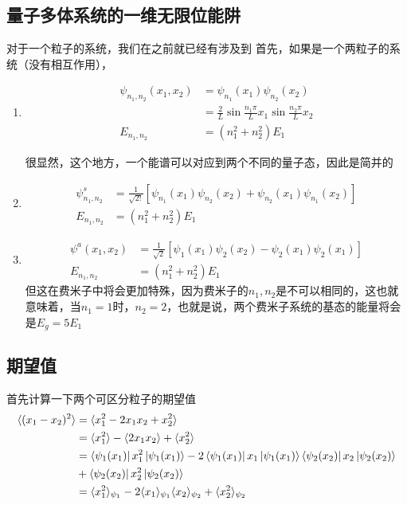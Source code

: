 \documentclass{article}
\newcommand{\expectation}[1]{\langle #1 \rangle}
\begin{document}
\subsection{量子多体系统的一维无限位能阱}
对于一个粒子的系统，我们在之前就已经有涉及到
首先，如果是一个两粒子的系统（没有相互作用），
\begin{enumerate}
	\item[可分辨粒子]
	      \begin{align*}
		      \psi_{n_1,n_2}(x_1,x_2) & =\psi_{n_1}(x_1)\psi_{n_2}(x_2)                                \\
		                              & =\frac{2}{L}\sin{\frac{n_1\pi}{L}x_1}\sin{\frac{n_2\pi}{L}x_2} \\
		      E_{n_1,n_2}             & =(n_1^2+n_2^2)E_1
	      \end{align*}

	      很显然，这个地方，一个能谱可以对应到两个不同的量子态，因此是简并的
	\item[玻色子]
	      \begin{align*}
		      \psi_{n_1,n_2}^s & =\frac{1}{\sqrt{2!}}\left[\psi_{n_1}(x_1)\psi_{n_2}(x_2)+\psi_{n_2}(x_1)\psi_{n_1}(x_2)\right] \\
		      E_{n_1,n_2}      & =(n_1^2+n_2^2)E_1
	      \end{align*}
	\item[费米子]
	      \begin{align*}
		      \psi^a(x_1,x_2) & =\frac{1}{\sqrt{2}}\left[\psi_1(x_1)\psi_2(x_2)-\psi_2(x_1)\psi_2(x_1)\right] \\
		      E_{n_1,n_2}     & =(n_1^2+n_2^2)E_1
	      \end{align*}
	      但这在费米子中将会更加特殊，因为费米子的$n_1,n_2$是不可以相同的，这也就意味着，当$n_1=1$时，$n_2=2$，也就是说，两个费米子系统的基态的能量将会是$E_g=5E_1$
\end{enumerate}

\subsection{期望值}
首先计算一下两个可区分粒子的期望值
\begin{align*}
	\expectation{(x_1-x_2)^2} & =\expectation{x_1^2-2x_1x_2+x_2^2}                                                                                   \\
	                          & =\expectation{x_1^2}-\expectation{2x_1x_2}+\expectation{x_2^2}                                                       \\
	                          & =\bra{\psi_1(x_1)}x_1^2\ket{\psi_1(x_1)}-2\bra{\psi_1(x_1)}x_1\ket{\psi_1(x_1)}\bra{\psi_2(x_2)}x_2\ket{\psi_2(x_2)} \\
	                          & +\bra{\psi_2(x_2)}x_2^2\ket{\psi_2(x_2)}                                                                             \\
	                          & =\expectation{x_1^2}_{\psi_1}-2\expectation{x_1}_{\psi_1}\expectation{x_2}_{\psi_2}+\expectation{x_2^2}_{\psi_2}
\end{align*}
\end{document}
